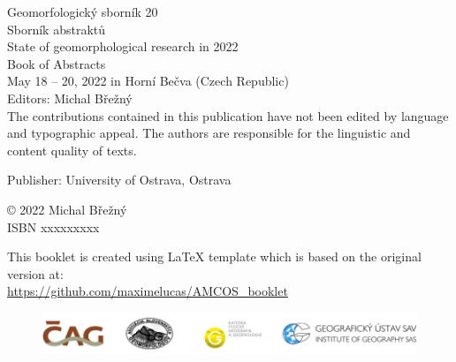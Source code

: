 \documentclass[
	openany, %
	parskip=false, %
	12pt, %
	a4paper, %
]{conferencebooklet} %
\begin{document}
\begin{center}	
Geomorfologický sborník 20\\
\vspace{2em}
Sborník abstraktů\\
\vspace{2em}
State of geomorphological research in 2022\\
\vspace{2em}
Book of Abstracts\\
May 18 – 20, 2022 in Horní Bečva (Czech Republic)\\
\vspace{2em}
Editors: Michal Břežný\\ \vspace{2em}
The contributions contained in this publication have not been edited by language and 
typographic appeal. The authors are responsible for the linguistic and content quality of texts.
\\ \vspace{2em}

Publisher: University of Ostrava, Ostrava \\\vspace{2em}

© 2022 Michal Břežný\\
\vspace{2em}
ISBN xxxxxxxxx\\

\vspace{5em}





	This booklet is created using \LaTeX{} template which is based on the original version at:\\ \url{https://github.com/maximelucas/AMCOS\_booklet}
\end{center}
\begin{figure}[t]
	\centering
	\includegraphics[width=1\linewidth]{images/geomorfologie-logolink}
	
\end{figure}
\newpage
\end{document}
